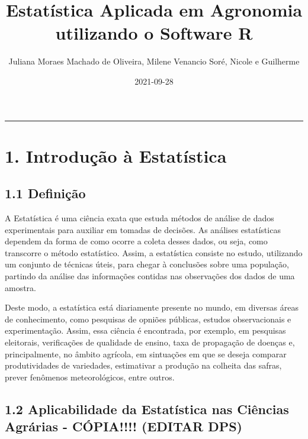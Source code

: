 \documentclass[
]{book}
\title{Estatística Aplicada em Agronomia utilizando o Software R}
\author{Juliana Moraes Machado de Oliveira, Milene Venancio Soré, Nicole e Guilherme}
\date{2021-09-28}
\theoremstyle{definition}
\theoremstyle{definition}
\theoremstyle{definition}
\theoremstyle{definition}
\theoremstyle{remark}
\begin{document}
\maketitle

{
\setcounter{tocdepth}{1}
\tableofcontents
}
\begin{center}\rule{0.5\linewidth}{0.5pt}\end{center}

\hypertarget{introduuxe7uxe3o-uxe0-estatuxedstica}{%
\chapter{1. Introdução à Estatística}\label{introduuxe7uxe3o-uxe0-estatuxedstica}}

\hypertarget{definiuxe7uxe3o}{%
\section{1.1 Definição}\label{definiuxe7uxe3o}}

A Estatística é uma ciência exata que estuda métodos de análise de dados experimentais para auxiliar em tomadas de decisões. As análises estatísticas dependem da forma de como ocorre a coleta desses dados, ou seja, como transcorre o método estatístico. Assim, a estatística consiste no estudo, utilizando um conjunto de técnicas úteis, para chegar à conclusões sobre uma população, partindo da análise das informações contidas nas observações dos dados de uma amostra.

Deste modo, a estatística está diariamente presente no mundo, em diversas áreas de conhecimento, como pesquisas de opniões públicas, estudos observacionais e experimentação. Assim, essa ciência é encontrada, por exemplo, em pesquisas eleitorais, verificações de qualidade de ensino, taxa de propagação de doenças e, principalmente, no âmbito agrícola, em sintuações em que se deseja comparar produtividades de variedades, estimativar a produção na colheita das safras, prever fenômenos meteorológicos, entre outros.

\hypertarget{aplicabilidade-da-estatuxedstica-nas-ciuxeancias-agruxe1rias---cuxf3pia-editar-dps}{%
\section{1.2 Aplicabilidade da Estatística nas Ciências Agrárias - CÓPIA!!!! (EDITAR DPS)}\label{aplicabilidade-da-estatuxedstica-nas-ciuxeancias-agruxe1rias---cuxf3pia-editar-dps}}
\end{document}
